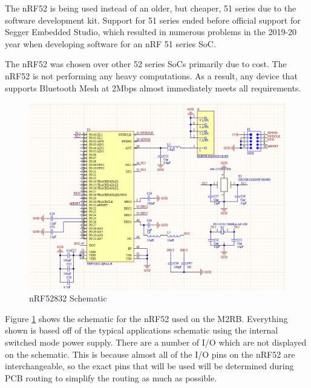 \documentclass[crop=false]{standalone}
\begin{document}
        The nRF52 is being used instead of an older, but cheaper, 51 series due to the software development kit. Support for 51 series ended before official support for Segger Embedded Studio, which resulted in numerous problems in the 2019-20 year when developing software for an nRF 51 series SoC.
            
        The nRF52 was chosen over other 52 series SoCs primarily due to cost. The nRF52 is not performing any heavy computations. As a result, any device that supports Bluetooth Mesh at 2Mbps almost immediately meets all requirements.
        
        \begin{figure}[H]
            \centering
            \includegraphics[width=\textwidth]{M2RBnRF.PNG}
            \caption{nRF52832 Schematic}
            \label{fig:M2RBnRF52}
        \end{figure}
            
        Figure \ref{fig:M2RBnRF52} shows the schematic for the nRF52 used on the M2RB. Everything shown is based off of the typical applications schematic using the internal switched mode power supply. There are a number of I/O which are not displayed on the schematic. This is because almost all of the I/O pins on the nRF52 are interchangeable, so the exact pins that will be used will be determined during PCB routing to simplify the routing as much as possible.
        
\end{document}
